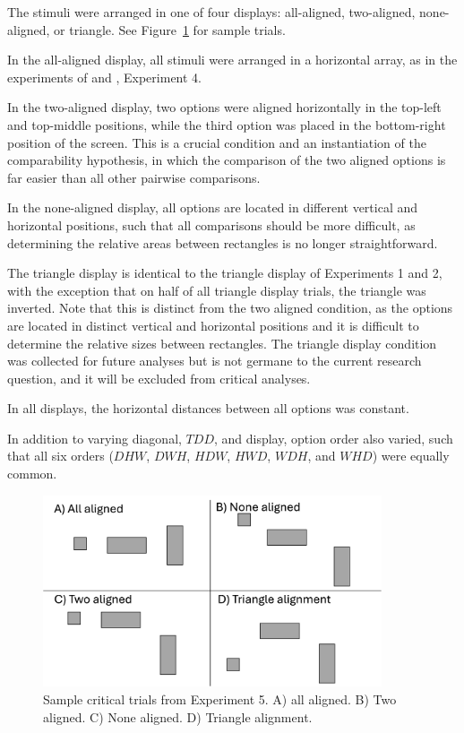 
The stimuli were arranged in one of four displays: all-aligned, two-aligned, none-aligned, or triangle. See Figure~\ref{fig:comparability_trials} for sample trials. 

In the all-aligned display, all stimuli were arranged in a horizontal array, as in the experiments of \textcite{trueblood2013not} and \textcite{spektorWhenGoodLooks2018b}, Experiment 4.

In the two-aligned display, two options were aligned horizontally in the top-left and top-middle positions, while the third option was placed in the bottom-right position of the screen. This is a crucial condition and an instantiation of the comparability hypothesis, in which the comparison of the two aligned options is far easier than all other pairwise comparisons.

In the none-aligned display, all options are located in different vertical and horizontal positions, such that all comparisons should be more difficult, as determining the relative areas between rectangles is no longer straightforward.

The triangle display is identical to the triangle display of Experiments 1 and 2, with the exception that on half of all triangle display trials, the triangle was inverted. Note that this is distinct from the two aligned condition, as the options are located in distinct vertical and horizontal positions and it is difficult to determine the relative sizes between rectangles. The triangle display condition was collected for future analyses but is not germane to the current research question, and it will be excluded from critical analyses.

In all displays, the horizontal distances between all options was constant.

In addition to varying diagonal, $TDD$, and display, option order also varied, such that all six orders ($DHW$, $DWH$, $HDW$, $HWD$, $WDH$, and $WHD$) were equally common.

\begin{figure}
   \begin{center}
      \includegraphics[width=100mm]{figures/comparability_design.jpg}
      \caption{Sample critical trials from Experiment 5. A) all aligned. B) Two aligned. C) None aligned. D) Triangle alignment.}
      \label{fig:comparability_trials}
   \end{center}
\end{figure}

